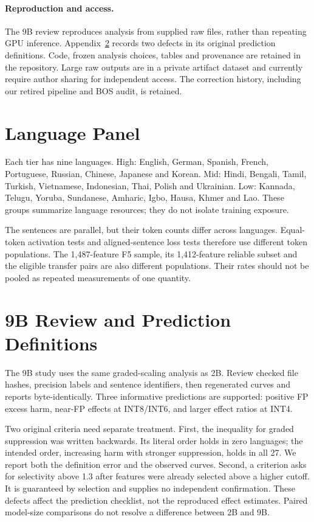 \documentclass[11pt]{article}
\begin{document}
\paragraph{Reproduction and access.}
The 9B review reproduces analysis from supplied raw files, rather than repeating GPU inference. Appendix~\ref{app:9b} records two defects in its original prediction definitions. Code, frozen analysis choices, tables and provenance are retained in the repository. Large raw outputs are in a private artifact dataset and currently require author sharing for independent access. The correction history, including our retired pipeline and BOS audit, is retained.



\clearpage
\appendix
\section{Language Panel}\label{app:languages}
Each tier has nine languages. High: English, German, Spanish, French, Portuguese, Russian, Chinese, Japanese and Korean. Mid: Hindi, Bengali, Tamil, Turkish, Vietnamese, Indonesian, Thai, Polish and Ukrainian. Low: Kannada, Telugu, Yoruba, Sundanese, Amharic, Igbo, Hausa, Khmer and Lao. These groups summarize language resources; they do not isolate training exposure.

The sentences are parallel, but their token counts differ across languages. Equal-token activation tests and aligned-sentence loss tests therefore use different token populations. The 1,487-feature F5 sample, its 1,412-feature reliable subset and the eligible transfer pairs are also different populations. Their rates should not be pooled as repeated measurements of one quantity.

\section{9B Review and Prediction Definitions}\label{app:9b}
The 9B study uses the same graded-scaling analysis as 2B. Review checked file hashes, precision labels and sentence identifiers, then regenerated curves and reports byte-identically. Three informative predictions are supported: positive FP excess harm, near-FP effects at INT8/INT6, and larger effect ratios at INT4.

Two original criteria need separate treatment. First, the inequality for graded suppression was written backwards. Its literal order holds in zero languages; the intended order, increasing harm with stronger suppression, holds in all 27. We report both the definition error and the observed curves. Second, a criterion asks for selectivity above 1.3 after features were already selected above a higher cutoff. It is guaranteed by selection and supplies no independent confirmation. These defects affect the prediction checklist, not the reproduced effect estimates. Paired model-size comparisons do not resolve a difference between 2B and 9B.
\end{document}
